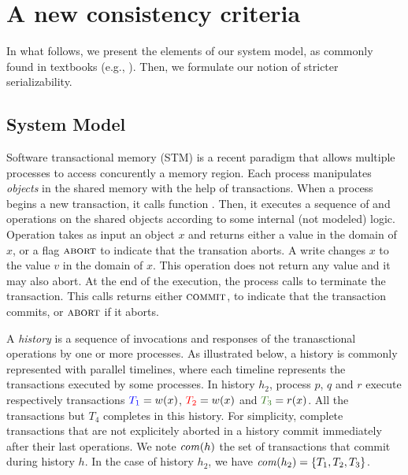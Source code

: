 \section{A new consistency criteria}

In what follows, we present the elements of our system model, as commonly found in textbooks (e.g., \cite{}).
Then, we formulate our notion of stricter serializability.

\subsection{System Model}

Software transactional memory (STM) is a recent paradigm that allows multiple processes to access concurently a memory region.
Each process manipulates \emph{objects} in the shared memory with the help of transactions.
When a process begins a new transaction, it calls function \stmBeginFunction.
Then, it executes a sequence of \stmReadFunction and \stmWriteFunction operations on the shared objects according to some internal (not modeled) logic.
Operation  takes as input an object $x$ and returns either a value in the domain of $x$, or a flag $\text{\textsc{abort}}$ to indicate that the transation aborts.
A write  changes $x$ to the value $v$ in the domain of $x$.
This operation does not return any value and it may also abort.
At the end of the execution, the process calls \stmTryCommitFunction to terminate the transaction.
This calls returns either $\text{\textsc{commit}}$, to indicate that the transaction commits, or $\text{\textsc{abort}}$ if it aborts.

A \emph{history} is a sequence of invocations and responses of the tranasctional operations by one or more processes.
As illustrated below, a history is commonly represented with parallel timelines, where each timeline represents the transactions executed by some processes.
In history $h_2$, process $p$, $q$ and $r$ execute respectively transactions ${\color{blue}{T_1}}=w(x)$, ${\color{red}{T_2}}=w(x)$ and ${\color{OliveGreen}{T_3}}=r(x)$.
All the transactions but $T_4$ completes in this history.
For simplicity, complete transactions that are not explicitely aborted in a history commit immediately after their last operations.
We note $\committed{h}$ the set of transactions that commit during history $h$.
In the case of history $h_2$, we have $\committed{h_2}=\{T_1,T_2,T_3\}$.



